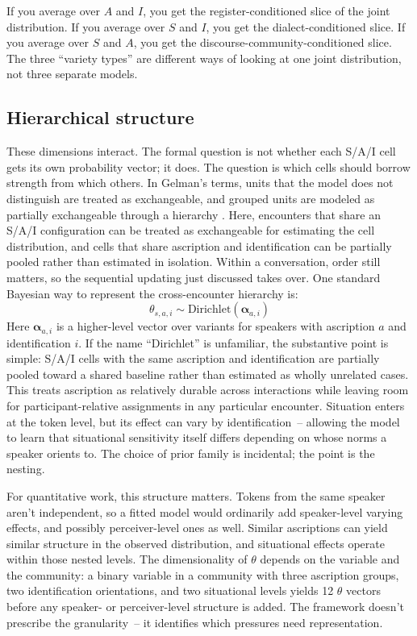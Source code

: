 \documentclass[11pt,letterpaper]{article}
\begin{document}
If you average over $A$ and $I$, you get the register-conditioned slice of the joint distribution. If you average over $S$ and $I$, you get the dialect-conditioned slice. If you average over $S$ and $A$, you get the discourse-community-conditioned slice. The three \enquote{variety types} are different ways of looking at one joint distribution, not three separate models.

\subsection{Hierarchical structure}

These dimensions interact. The formal question is not whether each S/A/I cell gets its own probability vector; it does. The question is which cells should borrow strength from which others. In Gelman's terms, units that the model does not distinguish are treated as exchangeable, and grouped units are modeled as partially exchangeable through a hierarchy \citep[Section~5.2]{GelmanBDA3}. Here, encounters that share an S/A/I configuration can be treated as exchangeable for estimating the cell distribution, and cells that share ascription and identification can be partially pooled rather than estimated in isolation. Within a conversation, order still matters, so the sequential updating just discussed takes over. One standard Bayesian way to represent the cross-encounter hierarchy is:
\begin{equation}
    \theta_{s,a,i} \sim \text{Dirichlet}(\boldsymbol{\alpha}_{a,i})
\end{equation}
Here $\boldsymbol{\alpha}_{a,i}$ is a higher-level vector over variants for speakers with ascription $a$ and identification $i$. If the name \enquote{Dirichlet} is unfamiliar, the substantive point is simple: S/A/I cells with the same ascription and identification are partially pooled toward a shared baseline rather than estimated as wholly unrelated cases. This treats ascription as relatively durable across interactions while leaving room for participant-relative assignments in any particular encounter. Situation enters at the token level, but its effect can vary by identification~-- allowing the model to learn that situational sensitivity itself differs depending on whose norms a speaker orients to. The choice of prior family is incidental; the point is the nesting.

For quantitative work, this structure matters. Tokens from the same speaker aren't independent, so a fitted model would ordinarily add speaker-level varying effects, and possibly perceiver-level ones as well. Similar ascriptions can yield similar structure in the observed distribution, and situational effects operate within those nested levels. The dimensionality of $\theta$ depends on the variable and the community: a binary variable in a community with three ascription groups, two identification orientations, and two situational levels yields 12 $\theta$ vectors before any speaker- or perceiver-level structure is added. The framework doesn't prescribe the granularity~-- it identifies which pressures need representation.
\end{document}
